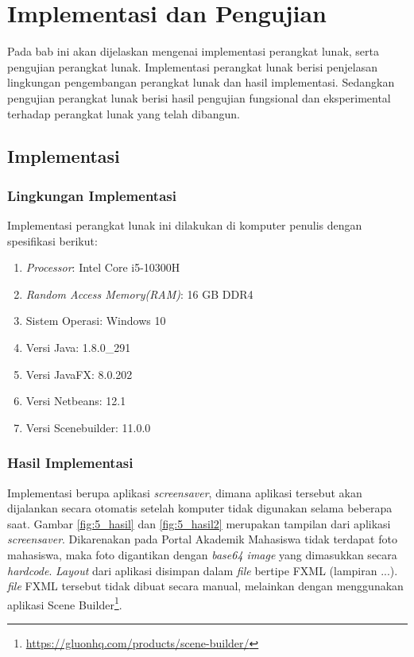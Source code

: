 \chapter{Implementasi dan Pengujian}
\label{chap:implementasi&pengujian}

Pada bab ini akan dijelaskan mengenai implementasi perangkat lunak, serta pengujian perangkat lunak. Implementasi perangkat lunak berisi penjelasan lingkungan pengembangan perangkat lunak dan hasil implementasi. Sedangkan pengujian perangkat lunak berisi hasil pengujian fungsional dan eksperimental terhadap perangkat lunak yang telah dibangun.

\section{Implementasi}

\subsection{Lingkungan Implementasi}
\label{lingkungan_implementasi}
Implementasi perangkat lunak ini dilakukan di komputer penulis dengan spesifikasi berikut:
\begin{enumerate}
    \item \textit{Processor}: Intel Core i5-10300H
    \item \textit{Random Access Memory(RAM)}: 16 GB DDR4
    \item Sistem Operasi: Windows 10
    \item Versi Java: 1.8.0\_291
    \item Versi JavaFX: 8.0.202
    \item Versi Netbeans: 12.1
    \item Versi Scenebuilder: 11.0.0
\end{enumerate}

\subsection{Hasil Implementasi}
Implementasi berupa aplikasi \textit{screensaver}, dimana aplikasi tersebut akan dijalankan secara otomatis setelah komputer tidak digunakan selama beberapa saat. Gambar \ref{fig:5_hasil} dan \ref{fig:5_hasil2} merupakan tampilan dari aplikasi \textit{screensaver}. Dikarenakan pada Portal Akademik Mahasiswa tidak terdapat foto mahasiswa, maka foto digantikan dengan \textit{base64 image} yang dimasukkan secara \textit{hardcode}. \textit{Layout} dari aplikasi disimpan dalam \textit{file} bertipe FXML (lampiran ...). \textit{file} FXML tersebut tidak dibuat secara manual, melainkan dengan menggunakan aplikasi Scene Builder\footnote{\url{https://gluonhq.com/products/scene-builder/}}. 

